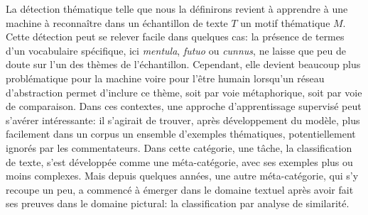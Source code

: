 La détection thématique telle que nous la définirons revient à apprendre à une machine à reconnaître dans un échantillon de texte $T$ un motif thématique $M$. Cette détection peut se relever facile dans quelques cas: la présence de termes d'un vocabulaire spécifique, ici \textit{mentula}, \textit{futuo} ou \textit{cunnus}, ne laisse que peu de doute sur l'un des thèmes de l'échantillon. Cependant, elle devient beaucoup plus problématique pour la machine voire pour l'être humain lorsqu'un réseau d'abstraction permet d'inclure ce thème, soit par voie métaphorique, soit par voie de comparaison. Dans ces contextes, une approche d'apprentissage supervisé peut s'avérer intéressante: il s'agirait de trouver, après développement du modèle, plus facilement dans un corpus un ensemble d'exemples thématiques, potentiellement ignorés par les commentateurs. Dans cette catégorie, une tâche, la classification de texte, s'est développée comme une méta-catégorie, avec ses exemples plus ou moins complexes. Mais depuis quelques années, une autre méta-catégorie, qui s'y recoupe un peu, a commencé à émerger dans le domaine textuel après avoir fait ses preuves dans le domaine pictural: la classification par analyse de similarité.

